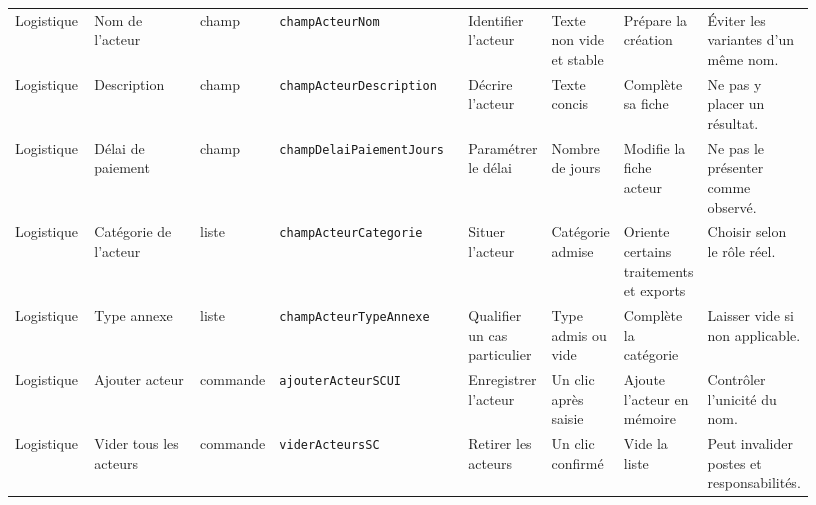 \begin{landscape}
{\begin{longtable}{L{0.10\linewidth} L{0.14\linewidth} L{0.07\linewidth} L{0.24\linewidth} L{0.09\linewidth} L{0.09\linewidth} L{0.10\linewidth} L{0.10\linewidth}}
Logistique & Nom de l'acteur & champ & \texttt{champActeurNom} & Identifier l'acteur & Texte non vide et stable & Prépare la création & Éviter les variantes d'un même nom. \\
Logistique & Description & champ & \texttt{champActeurDescription} & Décrire l'acteur & Texte concis & Complète sa fiche & Ne pas y placer un résultat. \\
Logistique & Délai de paiement & champ & \texttt{champDelaiPaiementJours} & Paramétrer le délai & Nombre de jours & Modifie la fiche acteur & Ne pas le présenter comme observé. \\
Logistique & Catégorie de l'acteur & liste & \texttt{champActeurCategorie} & Situer l'acteur & Catégorie admise & Oriente certains traitements et exports & Choisir selon le rôle réel. \\
Logistique & Type annexe & liste & \texttt{champActeurTypeAnnexe} & Qualifier un cas particulier & Type admis ou vide & Complète la catégorie & Laisser vide si non applicable. \\
Logistique & Ajouter acteur & commande & \texttt{ajouterActeurSCUI} & Enregistrer l'acteur & Un clic après saisie & Ajoute l'acteur en mémoire & Contrôler l'unicité du nom. \\
Logistique & Vider tous les acteurs & commande & \texttt{viderActeursSC} & Retirer les acteurs & Un clic confirmé & Vide la liste & Peut invalider postes et responsabilités. \\


\end{longtable}}
\end{landscape}
